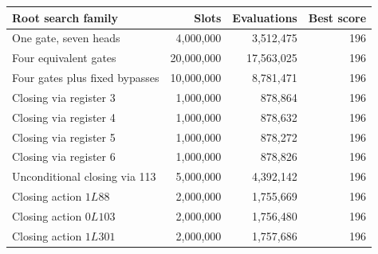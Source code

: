 \begin{center}\small
\begin{tabular}{@{}lrrr@{}}
\toprule
Root search family & Slots & Evaluations & Best score \\
\midrule
One gate, seven heads & 4,000,000 & 3,512,475 & 196 \\
Four equivalent gates & 20,000,000 & 17,563,025 & 196 \\
Four gates plus fixed bypasses & 10,000,000 & 8,781,471 & 196 \\
Closing via register 3 & 1,000,000 & 878,864 & 196 \\
Closing via register 4 & 1,000,000 & 878,632 & 196 \\
Closing via register 5 & 1,000,000 & 878,272 & 196 \\
Closing via register 6 & 1,000,000 & 878,826 & 196 \\
Unconditional closing via 113 & 5,000,000 & 4,392,142 & 196 \\
Closing action $1L88$ & 2,000,000 & 1,755,669 & 196 \\
Closing action $0L103$ & 2,000,000 & 1,756,480 & 196 \\
Closing action $1L301$ & 2,000,000 & 1,757,686 & 196 \\
\bottomrule
\end{tabular}
\end{center}
